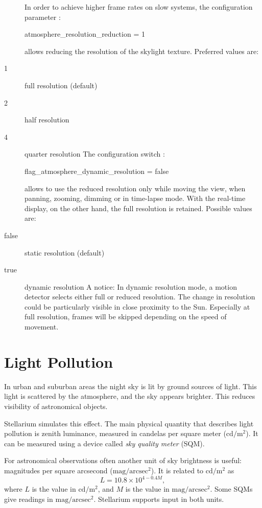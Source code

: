 \begin{description}
In order to achieve higher frame rates on slow systems,
the configuration parameter :
\begin{configfile}
[landscape]
atmosphere_resolution_reduction = 1
\end{configfile}
allows reducing the resolution of the skylight texture.
Preferred values are:
\item[1] full resolution (default)
\item[2] half resolution
\item[4] quarter resolution
The configuration switch :
\begin{configfile}
[landscape]
flag_atmosphere_dynamic_resolution = false
\end{configfile}
allows to use the reduced resolution only while moving the view, when panning, 
zooming, dimming or in time-lapse mode. With the real-time display, on the other hand, 
the full resolution is retained.
Possible values are:
\item[false] static resolution (default)
\item[true] dynamic resolution
A notice:
In dynamic resolution mode, a motion detector selects either full or reduced resolution.
The change in resolution could be particularly visible in close proximity to the Sun.
Especially at full resolution, frames will be skipped depending on the speed of movement.
\end{description}

\section{Light Pollution}

In urban and suburban areas the night sky is lit by ground sources of light.
This light is scattered by the atmosphere, and the sky appears brighter. This
reduces visibility of astronomical objects.

Stellarium simulates this effect. The main physical quantity that describes light pollution is zenith luminance, measured in candelas per square meter ($\mathrm{cd/m^2}$). It can be measured using a device called \emph{sky quality meter} (SQM).

For astronomical observations often another unit of sky brightness is useful: magnitudes per square arcsecond ($\mathrm{mag/arcsec^2}$). It is related to $\mathrm{cd/m^2}$ as
\begin{equation}
L=10.8\times10^{4-0.4M},
\end{equation}
where $L$ is the value in $\mathrm{cd/m^2}$, and $M$ is the value in $\mathrm{mag/arcsec^2}$. Some SQMs give readings in $\mathrm{mag/arcsec^2}$. Stellarium supports input in both units.


